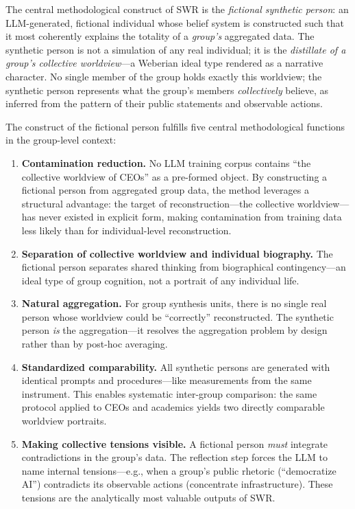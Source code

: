 \documentclass[11pt,a4paper]{article}
\theoremstyle{definition}
\theoremstyle{plain}
\theoremstyle{remark}
\begin{document}
The central methodological construct of SWR is the \emph{fictional synthetic person}: an LLM-generated, fictional individual whose belief system is constructed such that it most coherently explains the totality of a \emph{group's} aggregated data. The synthetic person is not a simulation of any real individual; it is the \emph{distillate of a group's collective worldview}---a Weberian ideal type rendered as a narrative character. No single member of the group holds exactly this worldview; the synthetic person represents what the group's members \emph{collectively} believe, as inferred from the pattern of their public statements and observable actions.

The construct of the fictional person fulfills five central methodological functions in the group-level context:

\begin{enumerate}[leftmargin=*]
  \item \textbf{Contamination reduction.} No LLM training corpus contains ``the collective worldview of CEOs'' as a pre-formed object. By constructing a fictional person from aggregated group data, the method leverages a structural advantage: the target of reconstruction---the collective worldview---has never existed in explicit form, making contamination from training data less likely than for individual-level reconstruction.
  \item \textbf{Separation of collective worldview and individual biography.} The fictional person separates shared thinking from biographical contingency---an ideal type of group cognition, not a portrait of any individual life.
  \item \textbf{Natural aggregation.} For group synthesis units, there is no single real person whose worldview could be ``correctly'' reconstructed. The synthetic person \emph{is} the aggregation---it resolves the aggregation problem by design rather than by post-hoc averaging.
  \item \textbf{Standardized comparability.} All synthetic persons are generated with identical prompts and procedures---like measurements from the same instrument. This enables systematic inter-group comparison: the same protocol applied to CEOs and academics yields two directly comparable worldview portraits.
  \item \textbf{Making collective tensions visible.} A fictional person \emph{must} integrate contradictions in the group's data. The reflection step forces the LLM to name internal tensions---e.g., when a group's public rhetoric (``democratize AI'') contradicts its observable actions (concentrate infrastructure). These tensions are the analytically most valuable outputs of SWR.
\end{enumerate}
\end{document}
